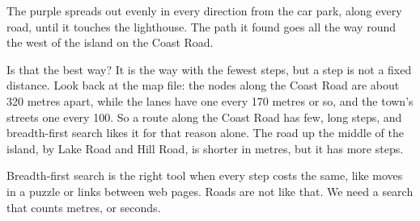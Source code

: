 The purple spreads out evenly in every direction from the car park, along
every road, until it touches the lighthouse. The path it found goes all the
way round the west of the island on the Coast Road.

Is that the best way? It is the way with the fewest steps, but a step is
not a fixed distance. Look back at the map file: the nodes along the Coast
Road are about 320 metres apart, while the lanes have one every 170 metres
or so, and the town's streets one every 100. So a route along the Coast
Road has few, long steps, and breadth-first search likes it for that
reason alone. The road up the middle of the island, by Lake Road and Hill
Road, is shorter in metres, but it has more steps.

Breadth-first search is the right tool when every step costs the same,
like moves in a puzzle or links between web pages. Roads are not like
that. We need a search that counts metres, or seconds.
